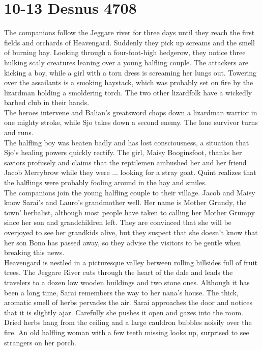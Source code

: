  \section{10-13 Desnus 4708}

The companions follow the Jeggare river for three days until they reach the first fields and orchards of Heavengard. Suddenly they pick up screams and the smell of burning hay. Looking through a four-foot-high hedgerow, they notice three hulking scaly creatures leaning over a young halfling couple. The attackers are kicking a boy, while a girl with a torn dress is screaming her lungs out. Towering over the assailants is a smoking haystack, which was probably set on fire by the lizardman holding a smoldering torch. The two other lizardfolk have a wickedly barbed club in their hands.\\

The heroes intervene and Balian's greatsword chops down a lizardman warrior in one mighty stroke, while Sjo takes down a second enemy. The lone survivor turns and runs.\\

The halfling boy was beaten badly and has lost consciousness, a situation that Sjo's healing powers quickly rectify. The girl, Maisy Booginsfoot,  thanks her saviors profusely and claims that the reptilemen ambushed her and her friend Jacob Merrybrow while they were ... looking for a stray goat. Quint realizes that the halflings were probably fooling around in the hay and smiles.\\

The companions join the young halfling couple to their village. Jacob and Maisy know Sarai's and Lauro's grandmother well. Her name is Mother Grundy, the town' herbalist, although most people have taken to calling her Mother Grumpy since her son and grandchildren left. They are convinced that she will be overjoyed to see her grandkids alive, but they suspect that she doesn't know that her son Bono has passed away, so they advise the visitors to be gentle when breaking this news.\\

Heavengard is nestled in a picturesque valley between rolling hillsides full of fruit trees. The Jeggare River cuts through the heart of the dale and leads the travelers to a dozen low wooden buildings and two stone ones. Although it has been a long time, Sarai remembers the way to her nana's house. The thick, aromatic smell of herbs pervades the air. Sarai approaches the door and notices that it is slightly ajar. Carefully she pushes it open and gazes into the room. Dried herbs hang from the ceiling and a large cauldron bubbles noisily over the fire. An old halfling woman with a few teeth missing looks up, surprised to see strangers on her porch.\\

